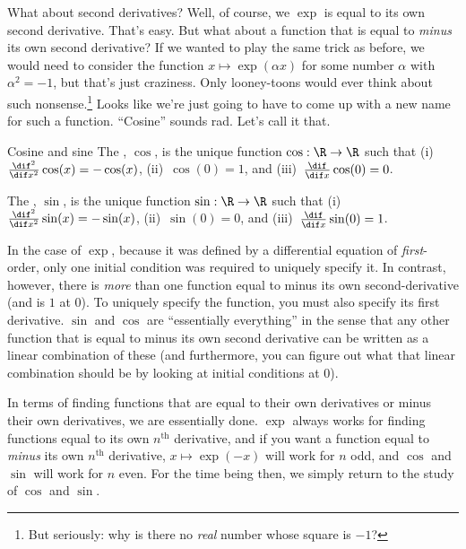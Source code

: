 What about second derivatives?  Well, of course, we $\exp$ is equal to its own second derivative.  That's easy.  But what about a function that is equal to \emph{minus} its own second derivative?  If we wanted to play the same trick as before, we would need to consider the function $x\mapsto \exp (\alpha x)$ for some number $\alpha$ with $\alpha ^2=-1$, but that's just craziness.  Only looney-toons would ever think about such nonsense.\footnote{But seriously:  why is there no \emph{real} number whose square is $-1$?}  Looks like we're just going to have to come up with a new name for such a function.  ``Cosine'' sounds rad.  Let's call it that.
\begin{dfn}{Cosine and sine}{}
The , $\cos$\index[notation]{$\cos$}, is the unique function $\cos :\R \rightarrow \R$ such that (i)~$\frac{\dif ^2}{\dif x^2}\cos (x)=-\cos (x)$, (ii)~$\cos (0)=1$, and (iii)~$\frac{\dif}{\dif x}\cos (0)=0$.

The , $\sin$\index[notation]{$\sin$}, is the unique function $\sin :\R \rightarrow \R$ such that (i)~$\frac{\dif ^2}{\dif x^2}\sin (x)=-\sin (x)$, (ii)~$\sin (0)=0$, and (iii)~$\frac{\dif}{\dif x}\sin (0)=1$.
\begin{rmk}
In the case of $\exp$, because it was defined by a differential equation of \emph{first}-order, only one initial condition was required to uniquely specify it.  In contrast, however, there is \emph{more} than one function equal to minus its own second-derivative (and is $1$ at $0$).  To uniquely specify the function, you must also specify its first derivative.  $\sin$ and $\cos$ are ``essentially everything'' in the sense that any other function that is equal to minus its own second derivative can be written as a linear combination of these (and furthermore, you can figure out what that linear combination should be by looking at initial conditions at $0$).
\end{rmk}
\end{dfn}

In terms of finding functions that are equal to their own derivatives or minus their own derivatives, we are essentially done.  $\exp$ always works for finding functions equal to its own $n^{\text{th}}$ derivative, and if you want a function equal to \emph{minus} its own $n^{\text{th}}$ derivative, $x\mapsto \exp (-x)$ will work for $n$ odd, and $\cos$ and $\sin$ will work for $n$ even.  For the time being then, we simply return to the study of $\cos$ and $\sin$.

